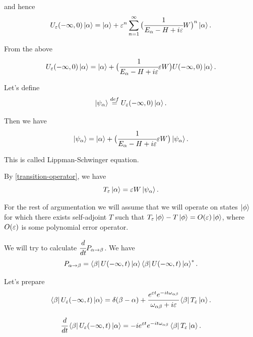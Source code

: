 \documentclass[main.tex]{subfiles}
\begin{document}
and hence
\begin{equation}
U_\eepsilon(-\infty, 0) \ket{\alpha} = \ket{\alpha} + \epsilon^n \sum_{n=1}^\infty \big(\cfrac{1}{E_\alpha - H + i\eepsilon}W\big)^n \ket{\alpha}.
\end{equation}

From the above
\begin{equation}
U_\eepsilon(-\infty, 0) \ket{\alpha} = \ket{\alpha} + \big(\cfrac{1}{E_\alpha - H + i\eepsilon}\epsilon W\big)U(-\infty, 0) \ket{\alpha}.
\end{equation}

Let's define
\begin{equation}
\ket{\psi_\alpha} \stackrel{def}{=} U_\eepsilon(-\infty, 0) \ket{\alpha}.
\end{equation}

Then we have
\begin{equation}
\ket{\psi_\alpha} = \ket{\alpha} + \big(\cfrac{1}{E_\alpha - H + i\eepsilon}\epsilon W\big)\ket{\psi_\alpha}.
\end{equation}

This is called Lippman-Schwinger equation.

By \ref{transition-operator}, we have
\begin{equation}
T_{\eepsilon}\ket{\alpha} = \epsilon W \ket{\psi_\alpha}. 
\end{equation}

For the rest of argumentation we will assume that we will operate on states $\ket{\phi}$ for which there exists self-adjoint $T$ such that 
$T_{\eepsilon}\ket{\phi} - T\ket{\phi} = O(\eepsilon)\ket{\phi}$, 
where $O(\eepsilon)$ is some polynomial error operator.

We will try to calculate $\cfrac{d}{dt} P_{\alpha\to\beta}$. We have
\begin{equation}
P_{\alpha\to\beta} = \bra{\beta}U (-\infty, t) \ket{\alpha}\bra{\beta}U (-\infty, t) \ket{\alpha}^*.
\end{equation}

Let's prepare
\begin{equation}
\bra{\beta}U_\eepsilon (-\infty, t) \ket{\alpha} = \delta(\beta - \alpha) + \cfrac{e^{\eepsilon t}e^{-it\omega_{\alpha\beta}}}{\omega_{\alpha\beta}+i\eepsilon } \bra{\beta}T_\epsilon \ket{\alpha}.
\end{equation}

\begin{equation}
\cfrac{d}{dt}
\bra{\beta}U_\eepsilon (-\infty, t) \ket{\alpha} = -ie^{\eepsilon t}e^{-it\omega_{\alpha\beta}}\bra{\beta}T_\eepsilon \ket{\alpha}.
\end{equation}
\end{document}
